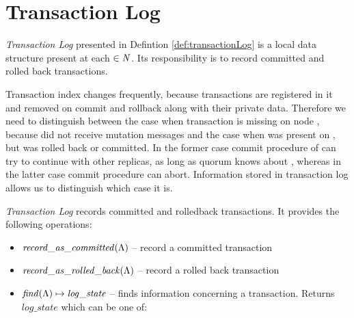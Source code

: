 
\section{Transaction Log}
\label{sec:mpp:transactionLog}
\emph{Transaction Log} presented in Defintion \ref{def:transactionLog} is a local data structure present at each $\in\text{$\mathit{N}$}$. Its responsibility is to record committed and rolled back transactions. 

Transaction index \txIndex changes frequently, because transactions are registered in it and removed on commit and rollback along with their private data. Therefore we need to distinguish between the case when transaction \transaction is missing on node , because  did not receive mutation messages and the case when \transaction was present on , but was rolled back or committed. In the former case commit procedure of \mpt can try to continue with other replicas, as long as quorum knows about \transaction, whereas in the latter case commit procedure can abort. Information stored in transaction log \txLog allows us to distinguish which case it is.


\begin{definition}
\label{def:transactionLog}
\emph{Transaction Log} \txLog records committed and rolledback transactions. It provides the following operations:
\begin{itemize}
\item $\mathit{record\_as\_committed(\text{$\Lambda$})}$ -- record a committed transaction
\item $\mathit{record\_as\_rolled\_back(\text{$\Lambda$})}$ -- record a rolled back transaction
\item $\mathit{find(\text{$\Lambda$})} \mapsto \mathit{log\_state}$ -- finds information concerning a transaction. Returns $\mathit{log\_state}$ which can be one of:  
\end{itemize}

\end{definition}
